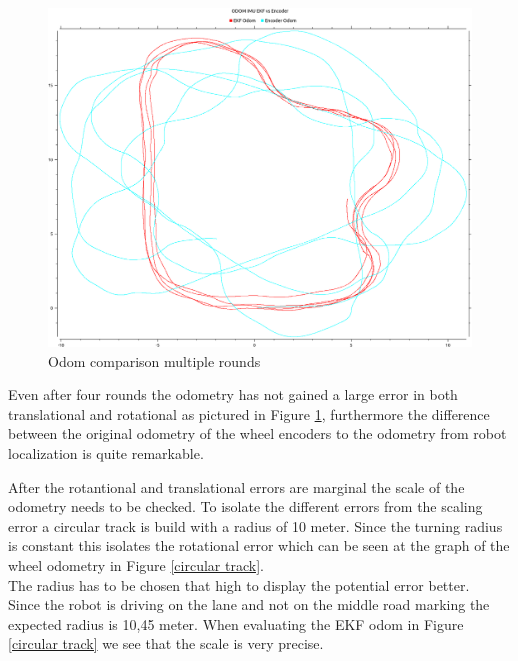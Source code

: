 \begin{figure}
	\includegraphics[width=\textwidth]{Pictures/odom comp multiple rounds}
	\caption{Odom comparison multiple rounds}
	\label{Odom comparison multiple rounds}

\end{figure}

Even after four rounds the odometry has not gained a large error in both translational and rotational as pictured in Figure \ref{Odom comparison multiple rounds}, furthermore the difference between the original odometry of the wheel encoders to the odometry from robot localization is quite remarkable.

After the rotantional and translational errors are marginal the scale of the odometry needs to be checked.
To isolate the different errors from the scaling error a circular track is build with a radius of 10 meter. Since the turning radius is constant this isolates the rotational error which can be seen at the graph of the wheel odometry in Figure \ref{circular track}.\\
The radius has to be chosen that high to display the potential error better.\\

Since the robot is driving on the lane and not on the middle road marking the expected radius is 10,45 meter. When evaluating the EKF odom in Figure \ref{circular track} we see that the scale is very precise.
 
